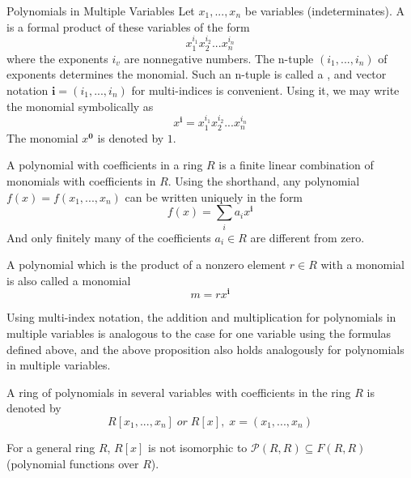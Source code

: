 \documentclass[12pt, a4paper, twoside, openright, titlepage]{book}
\begin{document}
\begin{defn}{Polynomials in Multiple Variables}{}
    Let $x_1,...,x_n$ be variables (indeterminates). A  is a formal product of these variables of the form \begin{equation}
            x_1^{i_1}x_2^{i_2}...x_n^{i_n}
    \end{equation}
    where the exponents $i_v$ are nonnegative numbers. The n-tuple $(i_1,...,i_n)$ of exponents determines the monomial. Such an n-tuple is called a , and vector notation $\mathbf{i} = (i_1,...,i_n)$ for multi-indices is convenient. Using it, we may write the monomial symbolically as \begin{equation}
            x^{\mathbf{i}}=x_1^{i_1}x_2^{i_2}...x_n^{i_n}
    \end{equation}
    The monomial $x^{\mathbf{0}}$ is denoted by $1$.


    A polynomial with coefficients in a ring $R$ is a finite linear combination of monomials with coefficients in $R$. Using the shorthand, any polynomial $f(x) = f(x_1,...,x_n)$ can be written uniquely in the form \begin{equation}
            f(x) = \sum\limits_{i} a_{i}x^{\mathbf{i}}
    \end{equation}
    And only finitely many of the coefficients $a_i \in R$ are different from zero.


    A polynomial which is the product of a nonzero element $r \in R$ with a monomial is also called a monomial \begin{equation}
            m=rx^{\mathbf{i}}
    \end{equation}


    Using multi-index notation, the addition and multiplication for polynomials in multiple variables is analogous to the case for one variable using the formulas defined above, and the above proposition also holds analogously for polynomials in multiple variables. 

    A ring of polynomials in several variables with coefficients in the ring $R$ is denoted by \begin{equation}
         R[x_1,...,x_n]\;or\;R[x],\;x=(x_1,...,x_n)
    \end{equation}
\end{defn}


\begin{rmk}{}{}
    For a general ring $R$, $R[x]$ is not isomorphic to $\mathcal{P}(R,R) \subseteq F(R,R)$ (polynomial functions over $R$).
\end{rmk}
\end{document}
